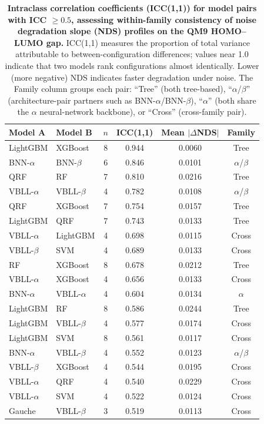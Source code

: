 \begin{table}[H]
\centering
\caption{\textbf{Intraclass correlation coefficients (ICC(1,1)) for model pairs with ICC $\geq 0.5$, assessing within-family consistency of noise degradation slope (NDS) profiles on the QM9 HOMO--LUMO gap.}
ICC(1,1) measures the proportion of total variance attributable to between-configuration differences; values near 1.0 indicate that two models rank configurations almost identically. Lower (more negative) NDS indicates faster degradation under noise. The Family column groups each pair: ``Tree'' (both tree-based), ``$\alpha$/$\beta$'' (architecture-pair partners such as BNN-$\alpha$/BNN-$\beta$), ``$\alpha$'' (both share the $\alpha$ neural-network backbone), or ``Cross'' (cross-family pair).}
\label{app:noise:model_icc}
\small
\begin{tabular}{llcccc}
\toprule
\textbf{Model A} & \textbf{Model B} & \textbf{$n$} & \textbf{ICC(1,1)} & \textbf{Mean $|\Delta$NDS$|$} & \textbf{Family} \\
\midrule
LightGBM & XGBoost & 8 & 0.944 & 0.0060 & Tree \\
BNN-$\alpha$ & BNN-$\beta$ & 6 & 0.846 & 0.0101 & $\alpha$/$\beta$ \\
QRF & RF & 7 & 0.810 & 0.0216 & Tree \\
VBLL-$\alpha$ & VBLL-$\beta$ & 4 & 0.782 & 0.0108 & $\alpha$/$\beta$ \\
QRF & XGBoost & 7 & 0.754 & 0.0157 & Tree \\
LightGBM & QRF & 7 & 0.743 & 0.0133 & Tree \\
VBLL-$\alpha$ & LightGBM & 4 & 0.698 & 0.0115 & Cross \\
VBLL-$\beta$ & SVM & 4 & 0.689 & 0.0133 & Cross \\
RF & XGBoost & 8 & 0.678 & 0.0212 & Tree \\
VBLL-$\alpha$ & XGBoost & 4 & 0.656 & 0.0133 & Cross \\
BNN-$\alpha$ & VBLL-$\alpha$ & 4 & 0.604 & 0.0134 & $\alpha$ \\
LightGBM & RF & 8 & 0.586 & 0.0244 & Tree \\
LightGBM & VBLL-$\beta$ & 4 & 0.577 & 0.0174 & Cross \\
LightGBM & SVM & 8 & 0.561 & 0.0117 & Cross \\
BNN-$\alpha$ & VBLL-$\beta$ & 4 & 0.552 & 0.0123 & $\alpha$/$\beta$ \\
VBLL-$\beta$ & XGBoost & 4 & 0.544 & 0.0195 & Cross \\
VBLL-$\alpha$ & QRF & 4 & 0.540 & 0.0229 & Cross \\
VBLL-$\alpha$ & SVM & 4 & 0.522 & 0.0124 & Cross \\
Gauche & VBLL-$\beta$ & 3 & 0.519 & 0.0113 & Cross \\
\bottomrule
\end{tabular}
\end{table}

